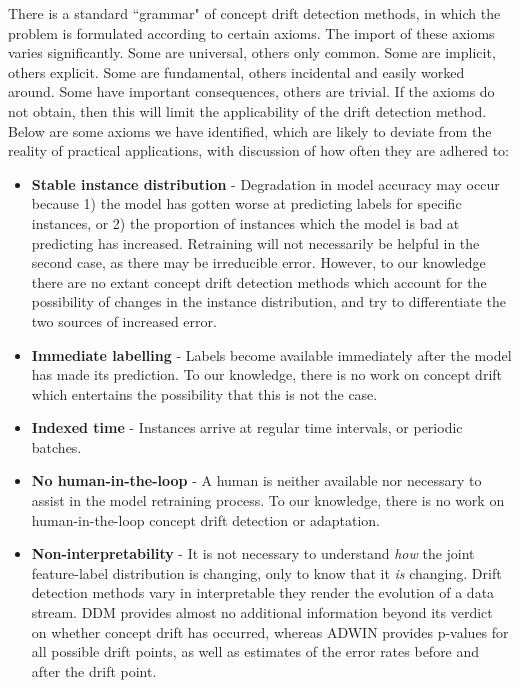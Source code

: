 There is a standard ``grammar" of concept drift detection methods, in which the problem is formulated according to certain axioms. The import of these axioms varies significantly. Some are universal, others only common. Some are implicit, others explicit. Some are fundamental, others incidental and easily worked around. Some have important consequences, others are trivial. If the axioms do not obtain, then this will limit the applicability of the drift detection method. Below are some axioms we have identified, which are likely to deviate from the reality of practical applications, with discussion of how often they are adhered to:
\begin{itemize}
  \item {\bf Stable instance distribution} - Degradation in model accuracy may occur because 1) the model has gotten worse at predicting labels for specific instances, or 2) the proportion of instances which the model is bad at predicting has increased. Retraining will not necessarily be helpful in the second case, as there may be irreducible error. However, to our knowledge there are no extant concept drift detection methods which account for the possibility of changes in the instance distribution, and try to differentiate the two sources of increased error.
  \item {\bf Immediate labelling} - Labels become available immediately after the model has made its prediction. To our knowledge, there is no work on concept drift which entertains the possibility that this is not the case.
  \item {\bf Indexed time} - Instances arrive at regular time intervals, or periodic batches. %
  \item {\bf No human-in-the-loop} - A human is neither available nor necessary to assist in the model retraining process. To our knowledge, there is no work on human-in-the-loop concept drift detection or adaptation.
  \item {\bf Non-interpretability} - It is not necessary to understand {\it how} the joint feature-label distribution is changing, only to know that it {\it is} changing. Drift detection methods vary in interpretable they render the evolution of a data stream. DDM provides almost no additional information beyond its verdict on whether concept drift has occurred, whereas ADWIN provides p-values for all possible drift points, as well as estimates of the error rates before and after the drift point. %

\end{itemize}
